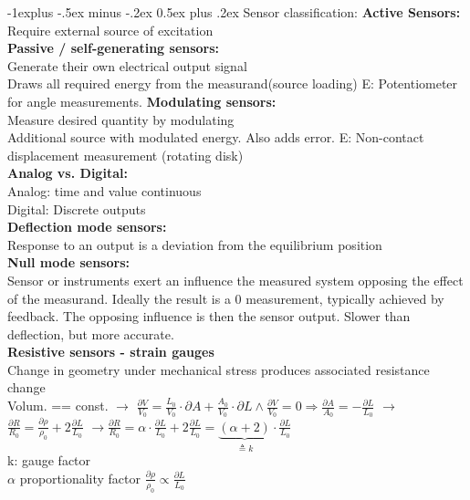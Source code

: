 \documentclass[5pt,landscape]{article}
\makeatletter
\renewcommand{\subsection}{\@startsection{subsection}{2}{0mm}%
                                {-1explus -.5ex minus -.2ex}%
                                {0.5ex plus .2ex}%
                                {\normalfont\normalsize\bfseries}}
\makeatother
\begin{document}
\begin{multicols*}{5}
\subsection{Sensor classification:}
\textbf{Active Sensors:}\\
Require external source of excitation\\
\textbf{Passive / self-generating sensors:}\\
Generate their own electrical output signal\\
Draws all required energy from the measurand(source loading)
E: Potentiometer for angle measurements.
\textbf{Modulating sensors:}\\
Measure desired quantity by modulating\\
Additional source with modulated energy. Also adds error.
E: Non-contact displacement measurement (rotating disk)\\
\textbf{Analog vs. Digital:}\\
Analog: time and value continuous\\
Digital: Discrete outputs\\
\textbf{Deflection mode sensors:}\\
Response to an output is a deviation from the equilibrium position\\
\textbf{Null mode sensors:}\\
Sensor or instruments exert an influence the measured system opposing the effect of the measurand. Ideally the result is a 0 measurement, typically achieved by feedback. The opposing influence is then the sensor output.
Slower than deflection, but more accurate.\\
\textbf{Resistive sensors - strain gauges}\\
Change in geometry under mechanical stress produces associated resistance change\\
Volum. == const. $ \rightarrow $ $ \frac{\partial V}{V_{0}}=\frac{L_{0}}{V_{0}} \cdot \partial A+\frac{A_{0}}{V_{0}} \cdot \partial L \wedge \frac{\partial V}{V_{0}}=0 \Rightarrow \frac{\partial A}{A_{0}}=-\frac{\partial L}{L_{0}}  $ $ \rightarrow $ $ \frac{\partial R}{R_{0}}=\frac{\partial \rho}{\rho_{0}}+2 \frac{\partial L}{L_{0}} $ $ \rightarrow $$ \frac{\partial R}{R_{0}}=\alpha \cdot \frac{\partial L}{L_{0}}+2 \frac{\partial L}{L_{0}}=\underbrace{(\alpha+2)}_{\triangleq k} \cdot \frac{\partial L}{L_{0}} $\\
k: gauge factor\\
$ \alpha $ proportionality factor $  \frac{\partial \rho}{\rho_{0}} \propto \frac{\partial L}{L_{0}}$
$$
\end{multicols*}
\end{document}
